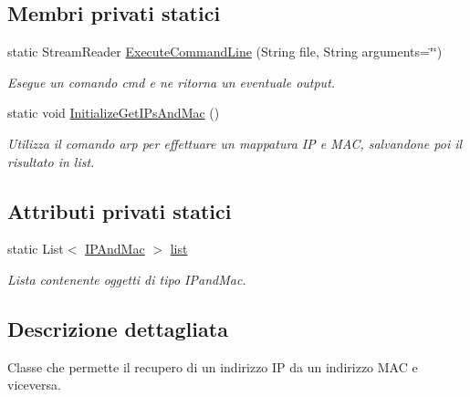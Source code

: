 \subsection*{Membri privati statici}
\begin{DoxyCompactItemize}
\item 
static Stream\+Reader \mbox{\hyperlink{classclient__app_1_1_i_p_m_a_c_mapper_af86bf89029e33b65100288ee2523190a}{Execute\+Command\+Line}} (String file, String arguments=\char`\"{}\char`\"{})
\begin{DoxyCompactList}\small\item\em Esegue un comando cmd e ne ritorna un eventuale output. \end{DoxyCompactList}\item 
\mbox{\label{classclient__app_1_1_i_p_m_a_c_mapper_a0a3d61256508bad7f2d9ace8e8ccecef}} 
static void \mbox{\hyperlink{classclient__app_1_1_i_p_m_a_c_mapper_a0a3d61256508bad7f2d9ace8e8ccecef}{Initialize\+Get\+I\+Ps\+And\+Mac}} ()
\begin{DoxyCompactList}\small\item\em Utilizza il comando arp per effettuare un mappatura IP e M\+AC, salvandone poi il risultato in list. \end{DoxyCompactList}\end{DoxyCompactItemize}
\subsection*{Attributi privati statici}
\begin{DoxyCompactItemize}
\item 
\mbox{\label{classclient__app_1_1_i_p_m_a_c_mapper_a1c3983b09eec163bc3fc320f52488974}} 
static List$<$ \mbox{\hyperlink{classclient__app_1_1_i_p_m_a_c_mapper_1_1_i_p_and_mac}{I\+P\+And\+Mac}} $>$ \mbox{\hyperlink{classclient__app_1_1_i_p_m_a_c_mapper_a1c3983b09eec163bc3fc320f52488974}{list}}
\begin{DoxyCompactList}\small\item\em Lista contenente oggetti di tipo I\+Pand\+Mac. \end{DoxyCompactList}\end{DoxyCompactItemize}


\subsection{Descrizione dettagliata}
Classe che permette il recupero di un indirizzo IP da un indirizzo M\+AC e viceversa. 

